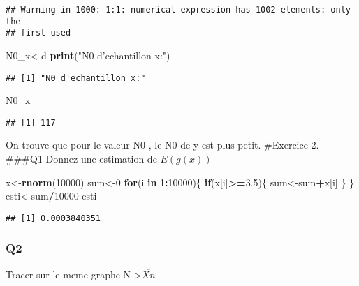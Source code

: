 \documentclass[]{article}
\newenvironment{Shaded}{\begin{snugshade}}{\end{snugshade}}
\newcommand{\KeywordTok}[1]{\textcolor[rgb]{0.13,0.29,0.53}{\textbf{#1}}}
\newcommand{\DecValTok}[1]{\textcolor[rgb]{0.00,0.00,0.81}{#1}}
\newcommand{\FloatTok}[1]{\textcolor[rgb]{0.00,0.00,0.81}{#1}}
\newcommand{\StringTok}[1]{\textcolor[rgb]{0.31,0.60,0.02}{#1}}
\newcommand{\ControlFlowTok}[1]{\textcolor[rgb]{0.13,0.29,0.53}{\textbf{#1}}}
\newcommand{\OperatorTok}[1]{\textcolor[rgb]{0.81,0.36,0.00}{\textbf{#1}}}
\newcommand{\NormalTok}[1]{#1}
\begin{document}
\begin{verbatim}
## Warning in 1000:-1:1: numerical expression has 1002 elements: only the
## first used
\end{verbatim}

\begin{Shaded}
\begin{Highlighting}[]
\NormalTok{N0_x<-d}
\KeywordTok{print}\NormalTok{(}\StringTok{"N0 d'echantillon x:"}\NormalTok{)}
\end{Highlighting}
\end{Shaded}

\begin{verbatim}
## [1] "N0 d'echantillon x:"
\end{verbatim}

\begin{Shaded}
\begin{Highlighting}[]
\NormalTok{N0_x}
\end{Highlighting}
\end{Shaded}

\begin{verbatim}
## [1] 117
\end{verbatim}

On trouve que pour le valeur N0 , le N0 de y est plus petit. \#Exercice
2. \#\#\#Q1 Donnez une estimation de \(E(g(x))\)

\begin{Shaded}
\begin{Highlighting}[]
\NormalTok{x<-}\KeywordTok{rnorm}\NormalTok{(}\DecValTok{10000}\NormalTok{)}
\NormalTok{sum<-}\DecValTok{0}
\ControlFlowTok{for}\NormalTok{(i }\ControlFlowTok{in} \DecValTok{1}\OperatorTok{:}\DecValTok{10000}\NormalTok{)\{}
  \ControlFlowTok{if}\NormalTok{(x[i]}\OperatorTok{>=}\FloatTok{3.5}\NormalTok{)\{}
\NormalTok{    sum<-sum}\OperatorTok{+}\NormalTok{x[i]}
\NormalTok{  \}}
\NormalTok{\}}
\NormalTok{esti<-sum}\OperatorTok{/}\DecValTok{10000}
\NormalTok{esti}
\end{Highlighting}
\end{Shaded}

\begin{verbatim}
## [1] 0.0003840351
\end{verbatim}

\subsubsection{Q2}\label{q2-1}

Tracer sur le meme graphe N-\textgreater{}\(\overline{Xn}\)
\end{document}

